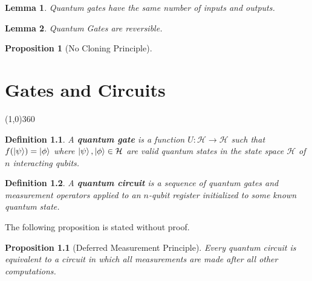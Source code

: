 \documentclass[12pt,twoside,fleqn]{report}
\theoremstyle{thmstyle}
\newtheorem{defn}{Definition}[chapter]
\newtheorem{lemma}{Lemma}[chapter]
\newtheorem{prop}{Proposition}[chapter]
\begin{document}
\begin{lemma}
    Quantum gates have the same number of inputs and outputs.
\end{lemma}

\begin{lemma}
    Quantum Gates are reversible.
\end{lemma}

\begin{prop}[No Cloning Principle]
\end{prop}

\chapter{Gates and Circuits}
\line(1,0){360} \\

\begin{comment}
     x Definitition of quantum gates
     x reversible defn
     x quantum circuit definition
     x deferred measurement principle
     x Representation of a quantum gate in dirac notation
     x gate which takes \ket\psi to \ket\phi
     x ket bra notation and how it describes a transformation
     x any reversible classical gate has a valid quantum analog
     * Single Qubit Gates
     * Eigen values and Eigenvectors of Hadamard Gate
     * Multiple Qubit Gates
     * Quantum Gates applied to one qubit in an $n$-qubit register
\end{comment}


\begin{defn}
    A \textbf{quantum gate} is a function $U: \mathcal{H} \to \mathcal{H}$ such that $f(\ket\psi) = \ket\phi$ where $\ket\psi, \ket\phi \in \mathcal{H}$ are valid quantum states in the state space $\mathcal{H}$ of $n$ interacting qubits.
\end{defn}

\begin{defn}
    A \textbf{quantum circuit} is a sequence of quantum gates and measurement operators applied to an $n$-qubit register initialized to some known quantum state.
\end{defn}

The following proposition is stated without proof. 

\begin{prop}[Deferred Measurement Principle]
    Every quantum circuit is equivalent to a circuit in which all measurements are made after all other computations.
\end{prop}
\end{document}
